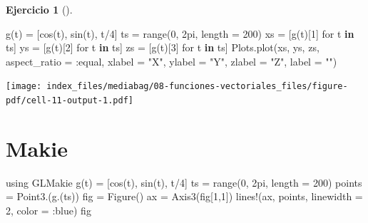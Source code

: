 \documentclass[
  a4paper,
]{scrreport}
\newenvironment{Shaded}{\begin{snugshade}}{\end{snugshade}}
\newcommand{\BuiltInTok}[1]{\textcolor[rgb]{0.00,0.23,0.31}{#1}}
\newcommand{\FloatTok}[1]{\textcolor[rgb]{0.68,0.00,0.00}{#1}}
\newcommand{\FunctionTok}[1]{\textcolor[rgb]{0.28,0.35,0.67}{#1}}
\newcommand{\ImportTok}[1]{\textcolor[rgb]{0.00,0.46,0.62}{#1}}
\newcommand{\KeywordTok}[1]{\textcolor[rgb]{0.00,0.23,0.31}{\textbf{#1}}}
\newcommand{\NormalTok}[1]{\textcolor[rgb]{0.00,0.23,0.31}{#1}}
\newcommand{\OperatorTok}[1]{\textcolor[rgb]{0.37,0.37,0.37}{#1}}
\newcommand{\StringTok}[1]{\textcolor[rgb]{0.13,0.47,0.30}{#1}}
\theoremstyle{definition}
\newtheorem{exercise}{Ejercicio}[chapter]
\theoremstyle{remark}
\begin{document}
\begin{exercise}[]
\begin{enumerate}
\begin{tcolorbox}
\begin{Shaded}
\begin{Highlighting}[]
\FunctionTok{g}\NormalTok{(t) }\OperatorTok{=}\NormalTok{ [}\FunctionTok{cos}\NormalTok{(t), }\FunctionTok{sin}\NormalTok{(t), t}\OperatorTok{/}\FloatTok{4}\NormalTok{] }
\NormalTok{ts }\OperatorTok{=} \FunctionTok{range}\NormalTok{(}\FloatTok{0}\NormalTok{, }\FloatTok{2}\NormalTok{pi, length }\OperatorTok{=} \FloatTok{200}\NormalTok{)}
\NormalTok{xs }\OperatorTok{=}\NormalTok{ [}\FunctionTok{g}\NormalTok{(t)[}\FloatTok{1}\NormalTok{] for t }\KeywordTok{in}\NormalTok{ ts]}
\NormalTok{ys }\OperatorTok{=}\NormalTok{ [}\FunctionTok{g}\NormalTok{(t)[}\FloatTok{2}\NormalTok{] for t }\KeywordTok{in}\NormalTok{ ts]}
\NormalTok{zs }\OperatorTok{=}\NormalTok{ [}\FunctionTok{g}\NormalTok{(t)[}\FloatTok{3}\NormalTok{] for t }\KeywordTok{in}\NormalTok{ ts]}
\NormalTok{Plots.}\FunctionTok{plot}\NormalTok{(xs, ys, zs, aspect\_ratio }\OperatorTok{=} \OperatorTok{:}\NormalTok{equal, xlabel }\OperatorTok{=} \StringTok{"X"}\NormalTok{, ylabel }\OperatorTok{=} \StringTok{"Y"}\NormalTok{, zlabel }\OperatorTok{=} \StringTok{"Z"}\NormalTok{, label }\OperatorTok{=} \StringTok{""}\NormalTok{)}
\end{Highlighting}
\end{Shaded}

  \texttt{[image: index\_files/mediabag/08-funciones-vectoriales\_files/figure-pdf/cell-11-output-1.pdf]}

  \section{Makie}

\begin{Shaded}
\begin{Highlighting}[]
\ImportTok{using} \BuiltInTok{GLMakie}
\FunctionTok{g}\NormalTok{(t) }\OperatorTok{=}\NormalTok{ [}\FunctionTok{cos}\NormalTok{(t), }\FunctionTok{sin}\NormalTok{(t), t}\OperatorTok{/}\FloatTok{4}\NormalTok{] }
\NormalTok{ts }\OperatorTok{=} \FunctionTok{range}\NormalTok{(}\FloatTok{0}\NormalTok{, }\FloatTok{2}\NormalTok{pi, length }\OperatorTok{=} \FloatTok{200}\NormalTok{)}
\NormalTok{points }\OperatorTok{=} \FunctionTok{Point3}\NormalTok{.(}\FunctionTok{g}\NormalTok{.(ts))}
\NormalTok{fig }\OperatorTok{=} \FunctionTok{Figure}\NormalTok{()}
\NormalTok{ax }\OperatorTok{=} \FunctionTok{Axis3}\NormalTok{(fig[}\FloatTok{1}\NormalTok{,}\FloatTok{1}\NormalTok{])}
\FunctionTok{lines!}\NormalTok{(ax, points, linewidth }\OperatorTok{=} \FloatTok{2}\NormalTok{, color }\OperatorTok{=} \OperatorTok{:}\NormalTok{blue)}
\NormalTok{fig}
\end{Highlighting}
\end{Shaded}


\end{tcolorbox}
\end{enumerate}
\end{exercise}
\end{document}
